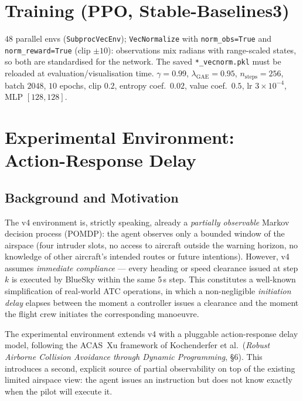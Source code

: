 \documentclass[11pt, a4paper]{article}
\begin{document}
\section{Training (PPO, Stable-Baselines3)}
$48$ parallel envs (\texttt{SubprocVecEnv}); \texttt{VecNormalize} with
\texttt{norm\_obs=True} and \texttt{norm\_reward=True} (clip $\pm10$): observations mix
radians with range-scaled states, so both are standardised for the network.
The saved \texttt{*\_vecnorm.pkl} must be reloaded at evaluation/visualisation time.
$\gamma=0.99$, $\lambda_\text{GAE}=0.95$, $n_\text{steps}=256$, batch $2048$, $10$ epochs,
clip $0.2$, entropy coef.\ $0.02$, value coef.\ $0.5$, lr $3\times10^{-4}$, MLP $[128,128]$.

\section{Experimental Environment: Action-Response Delay}
\label{sec:experimental}

\subsection{Background and Motivation}

The v4 environment is, strictly speaking, already a \emph{partially observable} Markov decision process (POMDP): the agent observes only a bounded window of the airspace (four intruder slots, no access to aircraft outside the warning horizon, no knowledge of other aircraft's intended routes or future intentions). However, v4 assumes \emph{immediate compliance} — every heading or speed clearance issued at step $k$ is executed by BlueSky within the same 5\,s step. This constitutes a well-known simplification of real-world ATC operations, in which a non-negligible \emph{initiation delay} elapses between the moment a controller issues a clearance and the moment the flight crew initiates the corresponding manoeuvre.

The experimental environment extends v4 with a pluggable action-response delay model, following the ACAS~Xu framework of Kochenderfer et al.\ (\emph{Robust Airborne Collision Avoidance through Dynamic Programming}, \S6). This introduces a second, explicit source of partial observability on top of the existing limited airspace view: the agent issues an instruction but does not know exactly when the pilot will execute it.
\end{document}
